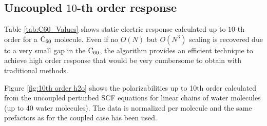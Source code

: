 \documentclass[prl,aps,twocolumn,showpacs,twocolumngrid,superbib]{revtex4}
\begin{document}
\subsection{Uncoupled $10$-th order response}




Table \ref{tab:C60_Values} shows static electric response
calculated up to $10$-th order for a $\rm C_{60}$ molecule.
Even if no $O(N)$ but $O(N^3)$ scaling is recovered due to a very small gap in the $\rm C_{60}$,
the algorithm provides an efficient technique to achieve high order response that
would be very cumbersome to obtain with traditional methods.


Figure \ref{fig:10th order h2o} shows the polarizabilities up to 10th
order calculated from the uncoupled perturbed SCF equations for linear
chains of water molecules (up to 40 water molecules). The data is normalized per molecule and the
same prefactors as for the coupled case has been used.
\end{document}
